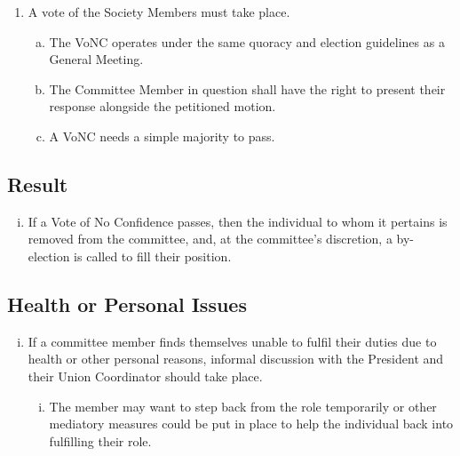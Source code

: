 \begin{enumerate}[i.]
\begin{enumerate}[1.]
        \item A vote of the Society Members must take place.
        \begin{enumerate}[(a).]
            \item The VoNC operates under the same quoracy and election guidelines as a General Meeting.
            \item The Committee Member in question shall have the right to present their response alongside the petitioned motion.
            \item A VoNC needs a simple majority to pass.
        \end{enumerate}
    \end{enumerate}
\end{enumerate}

\subsection{Result}
\begin{enumerate}[i.]
    \item If a Vote of No Confidence passes, then the individual to whom it pertains is removed from the committee, and, at the committee’s discretion, a by-election is called to fill their position.
\end{enumerate}

\subsection{Health or Personal Issues}
\begin{enumerate}[i.]
    \item If a committee member finds themselves unable to fulfil their duties due to health or other personal reasons, informal discussion with the President and their Union Coordinator should take place.
    \begin{enumerate}[i.]
        \item The member may want to step back from the role temporarily or other mediatory measures could be put in place to help the individual back into fulfilling their role.
    \end{enumerate}
\end{enumerate}